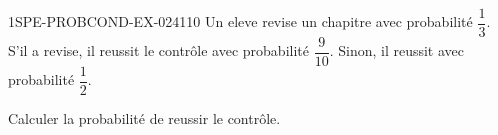 \begin{exercice}{1SPE-PROBCOND-EX-024}{1}{10}
Un eleve revise un chapitre avec probabilité $\dfrac{1}{3}$. S'il a revise, il reussit le contrôle avec probabilité $\dfrac{9}{10}$. Sinon, il reussit avec probabilité $\dfrac{1}{2}$.

Calculer la probabilité de reussir le contrôle.
\end{exercice}

